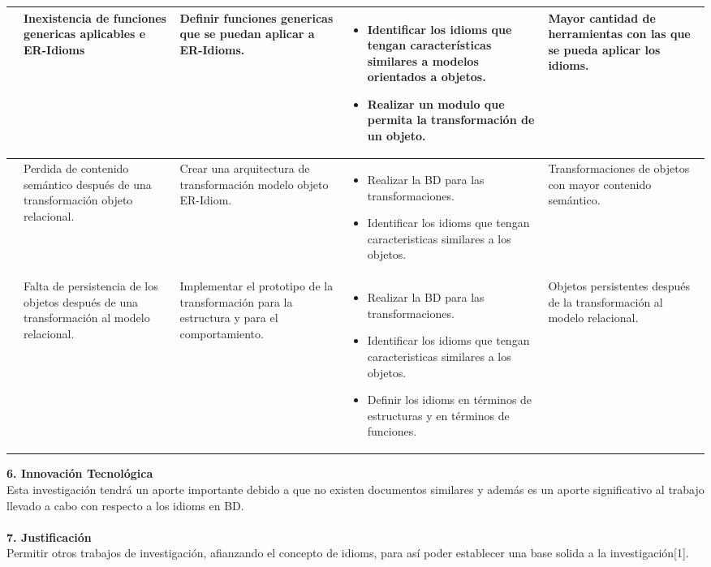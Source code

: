 \documentclass[11pt]{article}
\begin{document}
\begin{flushleft}
\begin{longtable}{|p{2.8cm}| p{2.8cm}| p{2.8cm}| p{2.8cm}| p{2.8cm}|}
	&
	{Inexistencia de funciones genericas aplicables e ER-Idioms} & Definir funciones genericas que se puedan aplicar a ER-Idioms.
	&
	\parbox {2.8cm}{
		\begin{itemize}
			\item Identificar los idioms que tengan características similares a modelos orientados a objetos.
			\item Realizar un modulo que permita la transformación de un objeto.
		\end{itemize}}
	& Mayor cantidad de herramientas con las que se pueda aplicar los idioms.\\ \hline
	&
	{Perdida de contenido semántico después de una transformación objeto relacional.}
	&
	Crear una arquitectura de transformación modelo objeto ER-Idiom. &
	\parbox{2.8cm} {
		\begin{itemize}
			\item Realizar la BD para las transformaciones.
			\item Identificar los idioms que tengan caracteristicas similares a los objetos.
		\end{itemize}}
	&
    Transformaciones de objetos con mayor contenido semántico. \\ \hline
    &
    {Falta de persistencia de los objetos después de una transformación al modelo relacional.} &
    Implementar el prototipo de la transformación para la estructura y para el comportamiento.
    &
    \parbox{2.8cm}{
    	\begin{itemize}
    		\item Realizar la BD para las transformaciones.
    		\item Identificar los idioms que tengan caracteristicas similares a los objetos.
    		\item Definir los idioms en términos de estructuras y en términos de funciones.
    	\end{itemize}}
    	&
    	Objetos persistentes después de la transformación al modelo relacional.\\ \hline
\end{longtable}
\textbf{6. Innovación Tecnológica}\\
{Esta investigación tendrá un aporte importante debido a que no existen documentos similares y además es un aporte significativo al trabajo llevado a cabo con respecto a los idioms en BD.}\\
\\ \textbf{7. Justificación}\\
{Permitir otros trabajos de investigación, afianzando el concepto de idioms, para así poder establecer una base solida a la investigación[1].} \par

\end{flushleft}
\end{document}
